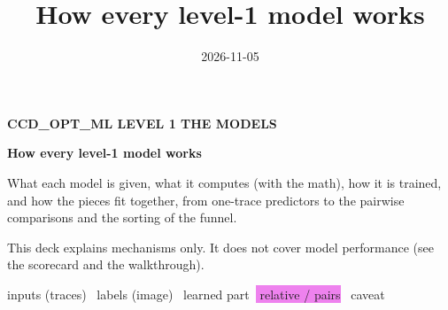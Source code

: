 \documentclass[aspectratio=169,11pt]{beamer}
\title{How every level-1 model works}
\date{2026-11-05}
\begin{document}
{
\begin{frame}[plain]
\vfill
{\color{trace!60}\small\bfseries CCD\_OPT\_ML \textperiodcentered{} LEVEL 1 \textperiodcentered{} THE MODELS}\par\vspace{0.8em}
{\color{paper}\LARGE\bfseries How every level-1 model works}\par\vspace{1em}
{\color{paper!80}\normalsize What each model is given, what it computes (with the math), how it is trained, and how the pieces fit together, from one-trace predictors to the pairwise comparisons and the sorting of the funnel.}\par\vfill
{\color{paper!70}\small This deck explains mechanisms only. It does not cover model performance (see the scorecard and the walkthrough).}\par\vspace{0.5em}
{\small\colorbox{trace}{\color{paper} inputs (traces)}\ \colorbox{image}{\color{paper} labels (image)}\ \colorbox{model}{\color{paper} learned part}\ \colorbox{violet}{\color{paper} relative / pairs}\ \colorbox{problem}{\color{paper} caveat}}
\end{frame}}

\end{document}
